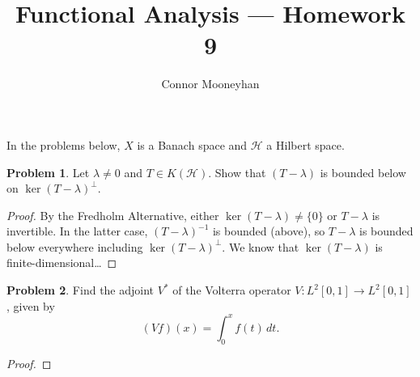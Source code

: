 \documentclass[12pt]{article}
\title{Functional Analysis --- Homework 9}
\author{Connor Mooneyhan}
\date{}
\theoremstyle{definition}
\newtheorem{ex}{Problem}
\begin{document}
\maketitle

In the problems below, $X$ is a Banach space and $\mathscr{H}$ a Hilbert space.

\begin{ex}
	Let $\lambda \neq 0$ and $T \in K(\mathscr{H})$.
	Show that $(T - \lambda)$ is bounded below on $\ker(T - \lambda)^\perp$.
\end{ex}
\begin{proof}
  By the Fredholm Alternative, either $\ker(T-\lambda) \neq \lbrace 0 \rbrace$ or $T-\lambda$ is invertible.
  In the latter case, $(T-\lambda)^{-1}$ is bounded (above), so $T-\lambda$ is bounded below everywhere including $\ker(T-\lambda)^\perp$.
  We know that $\ker(T-\lambda)$ is finite-dimensional\dots
\end{proof}

\begin{ex}
	Find the adjoint $V^*$ of the Volterra operator $V : L^2[0, 1] \to L^2[0, 1]$, given by \begin{equation*}
		(Vf)(x) = \int_0^x f(t) \, dt.
	\end{equation*}
\end{ex}
\begin{proof}
  
\end{proof}
\end{document}
